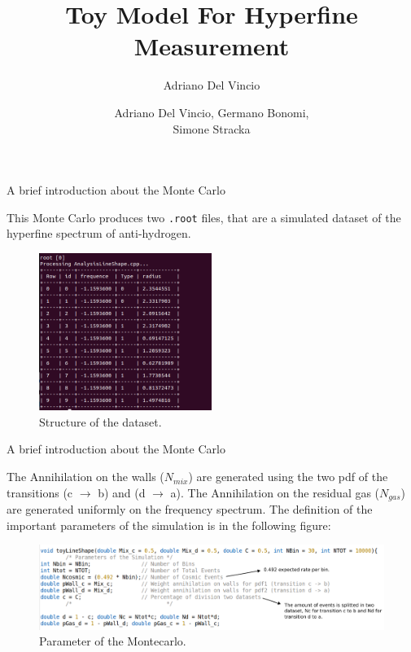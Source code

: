 \documentclass[9pt]{beamer}
\author{Adriano Del Vincio}
\title[Alpha 2]{Toy Model For Hyperfine Measurement}
\author[Adriano, Germano, Simone]{Adriano Del Vincio, Germano Bonomi,\\ Simone Stracka}
\institute[]{University of Brescia, INFN Pisa}
\begin{document}
\begin{frame}
\titlepage
\end{frame}



\begin{frame}{A brief introduction about the Monte Carlo}

This Monte Carlo produces two \texttt{.root} files, that are a simulated dataset of the hyperfine spectrum of anti-hydrogen.
\begin{figure}[hbtp]
 \centering
 \includegraphics[width = 0.5\textwidth]{StructureDataTree.png}
 \caption{ Structure of the dataset.}
 \end{figure}

\end{frame}

\begin{frame}{A brief introduction about the Monte Carlo}

The Annihilation on the walls ($N_{mix}$) are generated using the two pdf of the transitions (c $\rightarrow$ b) and (d $\rightarrow$ a). The Annihilation on the residual gas ($N_{gas}$) are generated uniformly on the frequency spectrum. The definition of the important parameters of the simulation is in the following figure:

\begin{figure}[hbtp]
\centering
\includegraphics[width = \textwidth]{MontecarloParams.pdf}
\caption{ Parameter of the Montecarlo.}
\end{figure}
\end{frame}
\end{document}
